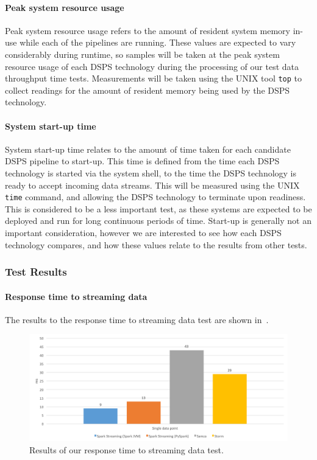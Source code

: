 \paragraph{Peak system resource usage}

Peak system resource usage refers to the amount of resident system memory in-use while each of the pipelines are running.
These values are expected to vary considerably during runtime, so samples will be taken at the peak system resource usage of each DSPS
technology during the processing of our test data throughput time tests.
Measurements will be taken using the UNIX tool \texttt{top} to collect readings for the amount of resident memory being used
by the DSPS technology.

\paragraph{System start-up time}

System start-up time relates to the amount of time taken for each candidate DSPS pipeline to start-up. This time is
defined from the time each DSPS technology is started via the system shell, to the time the DSPS technology is
ready to accept incoming data streams. This will be measured using the UNIX \texttt{time} command, and allowing the
DSPS technology to terminate upon readiness. This is considered to be a less important test, as these systems are expected
to be deployed and run for long continuous periods of time. Start-up is generally not an important consideration, however
we are interested to see how each DSPS technology compares, and how these values relate to the results from other tests.



\subsubsection{Test Results} %
\label{sub:test_results}

\paragraph{Response time to streaming data}

The results to the response time to streaming data test are shown in~.

\begin{figure}[H]
  \centering
  \includegraphics[width=1\textwidth]{includes/figures/fig_response_time_res}
  \caption{Results of our response time to streaming data test.}
  \label{fig:response_time_res}
\end{figure}

